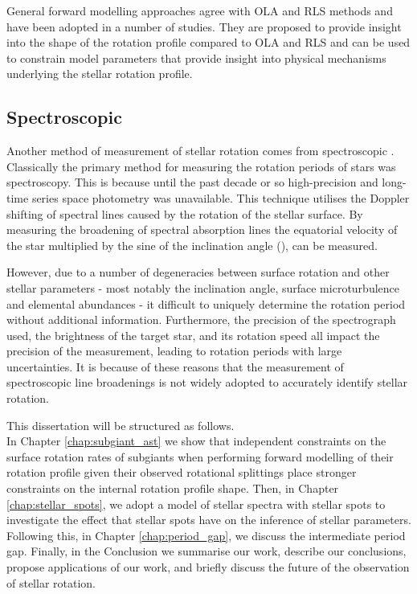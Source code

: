 General forward modelling approaches agree with OLA and RLS methods and have been adopted in a number of studies.
They are proposed to provide insight into the shape of the rotation profile compared to OLA and RLS and can be used to constrain model parameters that provide insight into physical mechanisms underlying the stellar rotation profile.

\subsection{Spectroscopic \vsini}

Another method of measurement of stellar rotation comes from spectroscopic \vsini.
Classically the primary method for measuring the rotation periods of stars was spectroscopy. 
This is because until the past decade or so high-precision and long-time series space photometry was unavailable.
This technique utilises the Doppler shifting of spectral lines caused by the rotation of the stellar surface.
By measuring the broadening of spectral absorption lines the equatorial velocity of the star multiplied by the sine of the inclination angle (\vsini), can be measured.

However, due to a number of degeneracies between surface rotation and other stellar parameters - most notably the inclination angle, surface microturbulence and elemental abundances - it difficult to uniquely determine the rotation period without additional information.
Furthermore, the precision of the spectrograph used, the brightness of the target star, and its rotation speed all impact the precision of the measurement, leading to rotation periods with large uncertainties.
It is because of these reasons that the measurement of spectroscopic line broadenings is not widely adopted to accurately identify stellar rotation.

\newpage
This dissertation will be structured as follows.\\
In Chapter \ref{chap:subgiant_ast} we show that independent constraints on the surface rotation rates of subgiants when performing forward modelling of their rotation profile given their observed rotational splittings place stronger constraints on the internal rotation profile shape. 
Then, in Chapter \ref{chap:stellar_spots}, we adopt a model of stellar spectra with stellar spots to investigate the effect that stellar spots have on the inference of stellar parameters.
Following this, in Chapter \ref{chap:period_gap}, we discuss the intermediate period gap.
Finally, in the Conclusion we summarise our work, describe our conclusions, propose applications of our work, and briefly discuss the future of the observation of stellar rotation.





